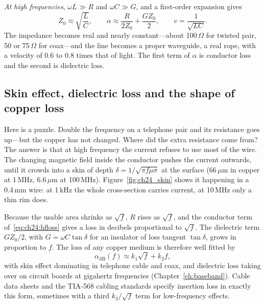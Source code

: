 \emph{At high frequencies}, $\omega L\gg R$ and $\omega C\gg G$, and a first-order expansion gives
\begin{equation}
Z_0\approx\sqrt{\frac LC},\qquad
\alpha\approx\frac{R}{2Z_0}+\frac{GZ_0}{2},\qquad v=\frac{1}{\sqrt{LC}}.
\label{eq:ch24:hfloss}
\end{equation}
The impedance becomes real and nearly constant---about 100\,$\Omega$ for twisted pair,
50 or 75\,$\Omega$ for coax---and the line becomes a proper waveguide, a real rope, with a velocity
of 0.6 to 0.8 times that of light. The first term of $\alpha$ is conductor loss and the second is
dielectric loss.

\subsection{Skin effect, dielectric loss and the shape of copper loss}

Here is a puzzle. Double the frequency on a telephone pair and its resistance goes up---but the
copper has not changed. Where did the extra resistance come from? The answer is that at high
frequency the current refuses to use most of the wire. The changing magnetic field inside the
conductor pushes the current outwards, until it crowds into a skin of depth
$\delta=1/\sqrt{\pi f\mu\sigma}$ at the surface (66\,$\mu$m in copper at 1\,MHz, 6.6\,$\mu$m at
100\,MHz). Figure~\ref{fig:ch24_skin} shows it happening in a 0.4\,mm wire: at 1\,kHz the whole
cross-section carries current, at 10\,MHz only a thin rim does.


Because the usable area shrinks as $\sqrt f$, $R$ rises as $\sqrt f$, and the conductor term
of~\eqref{eq:ch24:hfloss} gives a loss in decibels proportional to $\sqrt f$. The dielectric term
$GZ_0/2$, with $G=\omega C\tan\delta$ for an insulator of loss tangent $\tan\delta$, grows in
proportion to $f$. The loss of any copper medium is therefore well fitted by
\begin{equation}
\alpha_{\mathrm{dB}}(f)\approx k_1\sqrt f+k_2f,
\label{eq:ch24:k1k2}
\end{equation}
with skin effect dominating in telephone cable and coax, and dielectric loss taking over on
circuit boards at gigahertz frequencies (Chapter~\ref{ch:baseband}). Cable data sheets and the
TIA-568 cabling standards specify insertion loss in exactly this form, sometimes with a third
$k_3/\sqrt f$ term for low-frequency effects.

